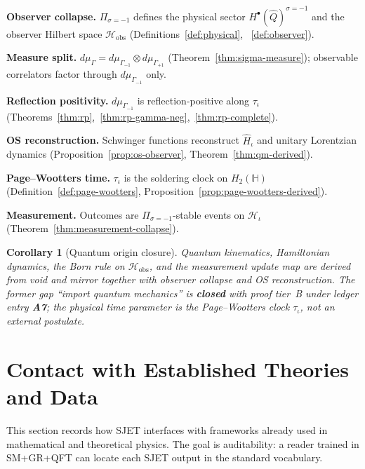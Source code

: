 \documentclass[aps,prd,onecolumn,amsmath,amssymb,nofootinbib,11pt]{revtex4-2}
\numberwithin{equation}{section}
\theoremstyle{plain}
\newtheorem{corollary}[theorem]{Corollary}
\theoremstyle{definition}
\theoremstyle{remark}
\newcommand{\Quat}{\mathbb{H}}
\begin{document}
\medskip
\noindent\textbf{Observer collapse.}
$\Pi_{\sigma=-1}$ defines the physical sector
$H^\bullet(\hat Q)^{\sigma=-1}$ and the observer Hilbert space
$\mathcal{H}_{\mathrm{obs}}$ (Definitions~\ref{def:physical},
~\ref{def:observer}).

\medskip
\noindent\textbf{Measure split.}
$d\mu_\Gamma=d\mu_{\Gamma_{-1}}\otimes d\mu_{\Gamma_{+1}}$
(Theorem~\ref{thm:sigma-measure}); observable correlators factor through
$d\mu_{\Gamma_{-1}}$ only.

\medskip
\noindent\textbf{Reflection positivity.}
$d\mu_{\Gamma_{-1}}$ is reflection-positive along $\tau_\iota$
(Theorems~\ref{thm:rp},~\ref{thm:rp-gamma-neg},~\ref{thm:rp-complete}).

\medskip
\noindent\textbf{OS reconstruction.}
Schwinger functions reconstruct $\hat H_\iota$ and unitary Lorentzian
dynamics (Proposition~\ref{prop:os-observer}, Theorem~\ref{thm:qm-derived}).

\medskip
\noindent\textbf{Page--Wootters time.}
$\tau_\iota$ is the soldering clock on $H_2(\Quat)$
(Definition~\ref{def:page-wootters}, Proposition~\ref{prop:page-wootters-derived}).

\medskip
\noindent\textbf{Measurement.}
Outcomes are $\Pi_{\sigma=-1}$-stable events on $\mathcal{H}_\iota$
(Theorem~\ref{thm:measurement-collapse}).

\begin{corollary}[Quantum origin closure]\label{cor:qm-origin-closure}
Quantum kinematics, Hamiltonian dynamics, the Born rule on
$\mathcal{H}_{\mathrm{obs}}$, and the measurement update map are derived from
void and mirror together with observer collapse and OS reconstruction. The
former gap ``import quantum mechanics'' is \textbf{closed} with proof tier~B
under ledger entry \textbf{A7}; the physical time parameter is the
Page--Wootters clock $\tau_\iota$, not an external postulate.
\end{corollary}%
\section{Contact with Established Theories and Data}
\label{sec:standard-theories}

This section records how SJET interfaces with frameworks already used in
mathematical and theoretical physics. The goal is auditability: a reader
trained in SM+GR+QFT can locate each SJET output in the standard vocabulary.
\end{document}
